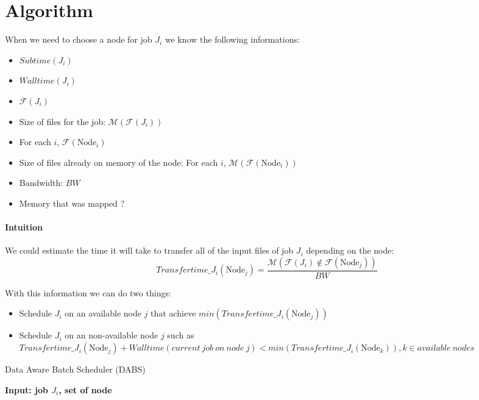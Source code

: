 \documentclass[a4paper]{article}
\newcommand{\Node}[1]{\ensuremath{\mathrm{Node}_{#1}}\xspace}
\newcommand{\inputs}{\ensuremath{\mathcal{F}}\xspace}
\newcommand{\memory}{\ensuremath{\mathcal{M}}\xspace}
\newcommand{\bandwidth}{\mathit{BW}\xspace}
\newcommand{\submissiontime}{\mathit{Subtime}\xspace}
\newcommand{\walltime}{\mathit{Walltime}\xspace}
\begin{document}
\section{Algorithm}

When we need to choose a node for job $J_i$ we know the following informations:
\begin{itemize}
	\item $\submissiontime(J_i)$
	\item $\walltime(J_i)$
	\item $\inputs(J_i)$
	\item Size of files for the job: $\memory(\inputs(J_i))$
	\item For each $i$, $\inputs(\Node{i})$
	\item Size of files already on memory of the node: For each $i$, $\memory(\inputs(\Node{i}))$
	\item Bandwidth: $\bandwidth$
	\item Memory that was mapped ?
\end{itemize}

\paragraph{Intuition} 
We could estimate the time it will take to transfer all of the input files of job $J_i$ depending on the node:
$$
	\mathit{Transfertime\_J_i}(\Node{j}) = \frac{\memory(\inputs(J_i) \notin \inputs(\Node{j}))}{\bandwidth}
$$

With this information we can do two things:
\begin{itemize}
	\item Schedule $J_i$ on an available node $j$ that achieve $min(\mathit{Transfertime\_J_i}(\Node{j}))$
	\item Schedule $J_i$ on an non-available node $j$ such as $\mathit{Transfertime\_J_i}(\Node{j}) + \walltime(current~job~on~node~j) < min(\mathit{Transfertime\_J_i}(\Node{k})), k \in available~nodes$
\end{itemize}


\begin{algorithm}[htbp]
	\caption{Data Aware Batch Scheduler (DABS)}\label{algo.dabs}
\hspace*{\algorithmicindent} \textbf{Input: job $J_i$, set of node} \\
	\begin{algorithmic}[1]
		\State  
	\end{algorithmic}
\end{algorithm}
\end{document}
